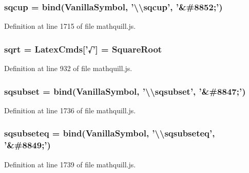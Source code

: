 \subsubsection[{sqcup}]{ sqcup = {\bf bind}({\bf Vanilla\-Symbol}, '\textbackslash{}\textbackslash{}sqcup', '\&\#8852;')}\label{mathquill_8js_a04a2c3138de93ac01a74767fcc816f70}


Definition at line 1715 of file mathquill.\-js.

\subsubsection[{sqrt}]{ sqrt = {\bf Latex\-Cmds}['√'] = {\bf Square\-Root}}\label{mathquill_8js_a992d11caa00ae91fb42c634bed36a8c0}


Definition at line 932 of file mathquill.\-js.

\subsubsection[{sqsubset}]{ sqsubset = {\bf bind}({\bf Vanilla\-Symbol}, '\textbackslash{}\textbackslash{}sqsubset', '\&\#8847;')}\label{mathquill_8js_ac5682361a8b06fe2ff65058e7e1e7f16}


Definition at line 1736 of file mathquill.\-js.

\subsubsection[{sqsubseteq}]{ sqsubseteq = {\bf bind}({\bf Vanilla\-Symbol}, '\textbackslash{}\textbackslash{}sqsubseteq', '\&\#8849;')}\label{mathquill_8js_acd3bb160a55519d4577cc85bb85be851}


Definition at line 1739 of file mathquill.\-js.

